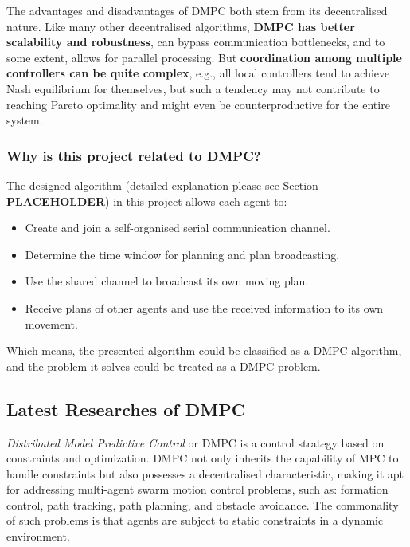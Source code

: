 {The advantages and disadvantages of DMPC both stem from its decentralised nature. 
Like many other decentralised algorithms, \textbf{DMPC has better scalability and robustness}, can bypass communication bottlenecks, and to some extent, allows for parallel processing.
But \textbf{coordination among multiple controllers can be quite complex},
e.g., all local controllers tend to achieve Nash equilibrium for themselves, but such a tendency may not contribute to reaching Pareto optimality and might even be counterproductive for the entire system\cite{Nash_Equi}.

\subsubsection{Why is this project related to DMPC?}

The designed algorithm (detailed explanation please see Section \textbf{PLACEHOLDER}) in this project allows each agent to:
\begin{itemize}
  \item Create and join a self-organised serial communication channel.
  \item Determine the time window for planning and plan broadcasting.
  \item Use the shared channel to broadcast its own moving plan.
  \item Receive plans of other agents and use the received information to its own movement.
\end{itemize}

Which means, the presented algorithm could be classified as a DMPC algorithm, and the problem it solves could be treated as a DMPC problem.

\subsection{Latest Researches of DMPC}
}

\textit{Distributed Model Predictive Control} or DMPC is a control strategy based on constraints and optimization\cite{DMPC_Review1}.
DMPC not only inherits the capability of MPC to handle constraints but also possesses a decentralised characteristic, making it apt for addressing multi-agent swarm motion control problems, 
such as: formation control\cite{Formation_Control}, path tracking\cite{Path_Tracking}, path planning\cite{Path_Planning}, and obstacle avoidance\cite{Obstacle_Avoid}.
The commonality of such problems is that agents are subject to static constraints in a dynamic environment.



